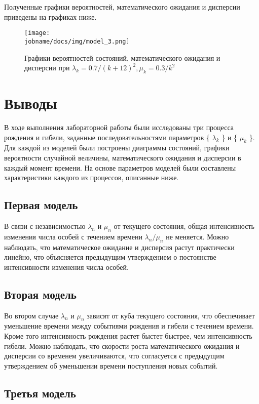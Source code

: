 Полученные графики вероятностей, математического ожидания и дисперсии приведены на графиках ниже.

\begin{figure}[h!]
    \centering
    \texttt{[image: \\jobname/docs/img/model\_3.png]}
    \caption{Графики вероятностей состояний, математического ожидания и дисперсии при $\lambda_k = 0.7 / (k + 12)^2, \mu_k = 0.3 / k^2$}
\end{figure}

\section*{Выводы}

В ходе выполнения лабораторной работы были исследованы три процесса рождения и гибели, заданные последовательностями
параметров \{ $\lambda_k$ \} и \{ $\mu_k$ \}.
Для каждой из моделей были построены диаграммы состояний, графики вероятности случайной величины, математического
ожидания и дисперсии в каждый момент времени.
На основе параметров моделей были составлены характеристики каждого из процессов, описанные ниже.

\subsection*{Первая модель}

В связи с независимостью $\lambda_n$ и $\mu_n$ от текущего состояния, общая интенсивность изменения числа особей с течением
времени $\lambda_n/\mu_n$ не меняется.
Можно наблюдать, что математическое ожидание и дисперсия растут практически линейно, что объясняется предыдущим
утверждением о постоянстве интенсивности изменения числа особей.

\subsection*{Вторая модель}

Во втором случае $\lambda_n$ и $\mu_n$ зависят от куба текущего состояния, что обеспечивает уменьшение времени
между событиями рождения и гибели с течением времени.
Кроме того интенсивность рождения растет быстет быстрее, чем интенсивность гибели.
Можно наблюдать, что скорости роста математического ожидания и дисперсии со временем увеличиваются, что согласуется с
предыдущим утверждением об уменьшении времени поступления новых событий.

\subsection*{Третья модель}

